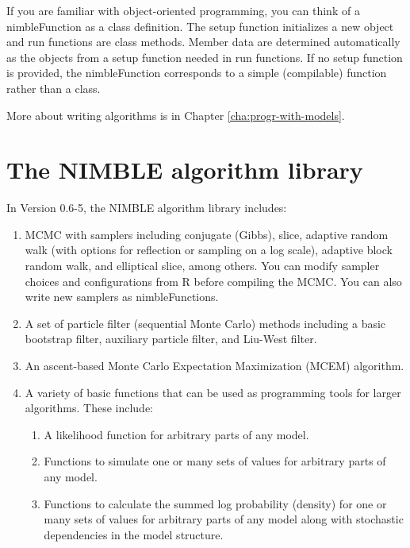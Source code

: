 \documentclass[12pt,oneside]{book}\usepackage[]{graphicx}\usepackage[]{color}
\newcommand{\ver}{0.6-5}
\begin{document}
If you are familiar with object-oriented programming, you can think of
a nimbleFunction as a class definition. The setup function
initializes a new object and run functions are class methods.
Member data are determined automatically as the objects from a
setup function needed in run functions.  If no setup
function is provided, the nimbleFunction corresponds to a simple
(compilable) function rather than a class.

More about writing algorithms is in Chapter \ref{cha:progr-with-models}.

\section{The NIMBLE algorithm library}
\label{sec:nimble-algor-libr}

In Version \ver, the NIMBLE algorithm library includes:

\begin{enumerate}
\item MCMC with samplers including conjugate (Gibbs), slice, adaptive
  random walk (with options for reflection or sampling on a log
  scale), adaptive block random walk, and elliptical slice, among others. You can
  modify sampler choices and configurations from R before compiling
  the MCMC.  You can also write new samplers as nimbleFunctions.
\item A set of particle filter (sequential Monte Carlo) methods
  including a basic bootstrap filter, auxiliary particle filter, and
  Liu-West filter.
\item An ascent-based Monte Carlo Expectation Maximization (MCEM)
  algorithm.
\item A variety of basic functions that can be used as programming
  tools for larger algorithms.  These include:
  \begin{enumerate}
  \item A likelihood function for arbitrary parts of any model.
  \item Functions to simulate one or many sets of values for arbitrary
    parts of any model.
  \item Functions to calculate the summed log probability (density)
    for one or many sets of values for arbitrary parts of any model
    along with stochastic dependencies in the model structure.
  \end{enumerate}

\end{enumerate}

 
\end{document}
